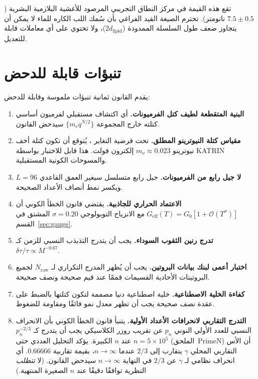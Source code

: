 \documentclass[11pt,a4paper]{article}
\begin{document}
	تقع هذه القيمة في مركز النطاق التجريبي المرصود للأغشية البلازمية البشرية (\(7.5 \pm 0.5\) نانومتر). تحترم الصيغة القيد الفراغي بأن سُمك اللب الكاره للماء لا يمكن أن يتجاوز ضعف طول السلسلة الممدودة (\(2 d_{\mathrm{lipid}}\))، ولا تحتوي على أي معاملات قابلة للتعديل.
	
	\section{تنبؤات قابلة للدحض}
	\label{sec:predictions}
	
	يقدم القانون ثمانية تنبؤات ملموسة وقابلة للدحض:
	
	\begin{enumerate}[label=(\arabic*)]
		\item \textbf{البنية المتقطعة لطيف كتل الفرميونات.} أي اكتشاف مستقبلي لفرميون أساسي كتلته خارج المجموعة \(\{m_e q^{N/2}\}\) سيدحض القانون.
		\item \textbf{مقياس كتلة النيوترينو المطلق.} تحت فرضية التغاير \cite{AppendixLambda}، يُتوقع أن تكون كتلة أخف نيوترينو \(m_{\nu} \approx 0.023\) إلكترون فولت. هذا قابل للاختبار بواسطة KATRIN والمسوحات الكونية المستقبلية.
		\item \textbf{لا جيل رابع من الفرميونات.} جيل رابع متسلسل سيغير العمق القاعدي \(L = 96\) ويكسر نمط أنصاف الأعداد الصحيحة.
		\item \textbf{الاعتماد الحراري للجاذبية.} يقتضي قانون الخطأ الكوني أن \(G_{\mathrm{eff}}(T) = G_0[1 + \mathcal{O}(T^{\sigma})]\) مع الانزياح التوبولوجي \(\sigma = 0.20\) المشتق في القسم~\ref{sec:gauge}.
		\item \textbf{تدرج رنين الثقوب السوداء.} يجب أن يتدرج التذبذب النسبي للزمن كـ \(\delta\tau/\tau \propto M^{-0.67}\).
		\item \textbf{اختبار أعمى لبنك بيانات البروتين.} يجب أن يُظهر المدرج التكراري لـ \(N_{\mathrm{raw}}\) لجميع البروتينات الأحادية القسيمات قممًا عند قيم صحيحة ونصف صحيحة.
		\item \textbf{كفاءة الخلية الاصطناعية.} خلية اصطناعية دنيا مصممة لتكون كتلتها بالضبط على عقدة نصف صحيحة يجب أن تظهر معدل نمو فائقًا ومقاومة للضغوط.
		\item \textbf{التدرج التقاربي لانحرافات الأعداد الأولية.} يتنبأ قانون الخطأ الكوني بأن الانحراف النسبي للعدد الأولي النوني \(p_n\) عن تقريب روزر الكلاسيكي يجب أن يتدرج كـ \(p_n^{-2/3}\) عند \(n\) الكبيرة. يؤكد التحليل العددي حتى \(n = 5\times10^5\) (الملحق~PrimeN) أن الأس التقاربي المحلي \(\gamma\) يتقارب إلى \(2/3\) عندما \(n\to\infty\)، بقيمة تقاربية \(0.66666\). أي انحراف نظامي لـ \(\gamma\) عن \(2/3\) في النهاية \(n\to\infty\) سيدحض القانون. (لا \emph{تتطلب} النظرية توافقًا دقيقًا عند \(n\) الصغيرة المنتهية.)
	\end{enumerate}
	
\end{document}
